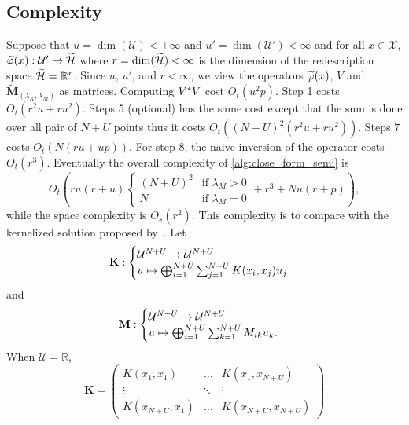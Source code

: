 \subsection{Complexity}
Suppose that $u=\dim(\mathcal{U})<+\infty$ and
$u'=\dim(\mathcal{U}')<\infty$ and for all $x\in\mathcal{X}$,
$\tildePhi{\omega}(x):\mathcal{U}'\to\tildeH{\omega}$ where
$r=\dim(\widetilde{\mathcal{H}})<\infty$ is the dimension of the redescription space
$\widetilde{\mathcal{H}}=\mathbb{R}^{r}$. Since $u$, $u'$, and $r<\infty$, we view the
operators $\tildePhi{\omega}(x)$, $V$ and
$\widetilde{\mathbf{M}}_{\left(\lambda_K,\lambda_M\right)}$ as matrices.
Computing $V^* V$ cost $O_t(u^2p)$. Step 1 costs $O_t(r^2u + ru^2)$.
Steps 5 (optional) has the same cost except that the sum is done over all pair
of $N+U$ points thus it costs $O_t((N+U)^2(r^2u + r u^2))$. Steps 7 costs
$O_t(N(ru + up))$. For step 8, the naive inversion of the operator costs
$O_t(r^3)$. Eventually the overall complexity of \cref{alg:close_form_semi} is
\begin{dmath*}
    O_t\left(ru(r + u) \begin{cases} (N+U)^2 & \text{if $\lambda_M > 0$} \\ N &
    \text{if $\lambda_M = 0$} \end{cases}+ r^3 + Nu(r+p) \right),
\end{dmath*}
while the space complexity is $O_s(r^2)$. This complexity is to compare with
the kernelized solution proposed by~\citet{minh2016unifying}. Let
\begin{dmath*}
    \mathbf{K}:
    \begin{cases}
        \mathcal{U}^{N+U} \to \mathcal{U}^{N+U} \\
        u\mapsto\Vect_{i=1}^{N+U}\sum_{j=1}^{N+U}K(x_i, x_j)u_j
    \end{cases}
\end{dmath*}
and
\begin{dmath*}
    \mathbf{M}:
    \begin{cases}
        \mathcal{U}^{N+U} \to \mathcal{U}^{N+U} \\
        u\mapsto\Vect_{i=1}^{N+U}\sum_{k=1}^{N+U}M_{ik}u_k.
    \end{cases}
\end{dmath*}
When $\mathcal{U}=\mathbb{R}$,
\begin{dmath*}
    \mathbf{K}=
    \begin{pmatrix} K(x_1, x_1) & \hdots & K(x_1, x_{N+U}) \\ \vdots
        & \ddots & \vdots \\  K(x_{N+U}, x_1) & \hdots & K(x_{N+U}, x_{N+U})
    \end{pmatrix}
\end{dmath*}
